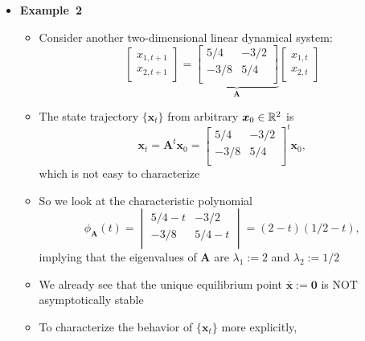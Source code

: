 \documentclass[12pt,a4paper]{article}
\begin{document}
\begin{itemize}
\item \textbf{Example~2}
  \begin{itemize}
  \item Consider another two-dimensional linear dynamical system:
    \begin{equation}\nonumber%
      \begin{bmatrix}
        x_{1,t+1} \\
        x_{2,t+1}
      \end{bmatrix}
      =
      \underbrace{
      \begin{bmatrix}
        5/4 & -3/2 \\
        -3/8 & 5/4 \\
      \end{bmatrix}}_{\bm{A}}
      \begin{bmatrix}
        x_{1,t} \\
        x_{2,t}
      \end{bmatrix}
    \end{equation}
    \item The state trajectory $\{\bm{x}_{t}\}$ from arbitrary $\bm{x}_{0}\in \mathbb{R}^{2}$ is
      \begin{equation}\nonumber%
        \bm{x}_{t}
        =
        \bm{A}^{t}\bm{x}_{0}
        =
      \begin{bmatrix}
        5/4 & -3/2 \\
        -3/8 & 5/4 \\
      \end{bmatrix}^{t}        
      \bm{x}_{0},
    \end{equation}
    which is not easy to characterize
  \item So we look at the characteristic polynomial
    \begin{equation}\nonumber%
      \phi_{\bm{A}}(t) = 
      \begin{vmatrix}
        5/4 - t & -3/2 \\
        -3/8 & 5/4 - t \\
      \end{vmatrix}
      = (2-t)(1/2-t),
    \end{equation}
    implying that
    the eigenvalues of $\bm{A}$ are $\lambda_{1}:=2$ and $\lambda_{2}:=1/2$
  \item We already see that
    the unique equilibrium point
    $\bar{\bm{x}}:=\bm{0}$ is NOT asymptotically stable
  \item To characterize the behavior of $\{\bm{x}_{t}\}$ more explicitly,

\end{itemize}
\end{itemize}
\end{document}
